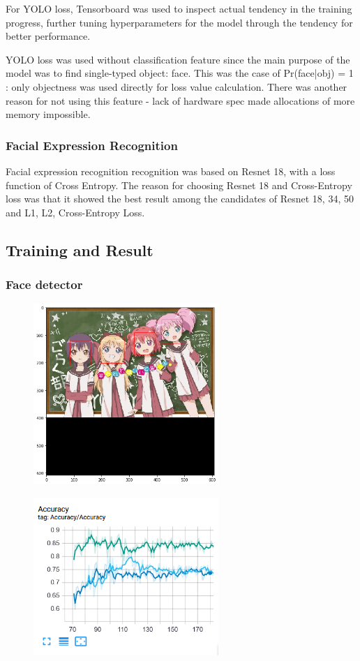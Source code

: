 \documentclass{article}
\begin{document}
For YOLO loss, Tensorboard was used to inspect actual tendency in the training
progress, further tuning hyperparameters for the model through the tendency for
better performance.


YOLO loss was used without classification feature since the main purpose of the
model was to find single-typed object: face. This was the case of Pr(face|obj) =
1 : only objectness was used directly for loss value calculation. There was
another reason for not using this feature - lack of hardware spec made
allocations of more memory impossible.

\subsubsection{Facial Expression Recognition}
Facial expression recognition recognition was based on Resnet 18, with a loss
function of Cross Entropy. The reason for choosing Resnet 18 and Cross-Entropy
loss was that it showed the best result among the candidates of Resnet 18, 34,
50 and L1, L2, Cross-Entropy Loss.

\subsection{Training and Result}
\subsubsection{Face detector}
\begin{figure}[h]
  \centering
  \includegraphics[width=7cm]{image/yolo_example.png}
\end{figure}
\begin{figure}[h]
  \centering
  \includegraphics[width=7cm]{image/yolo_accuracy.png}
\end{figure}
\end{document}
